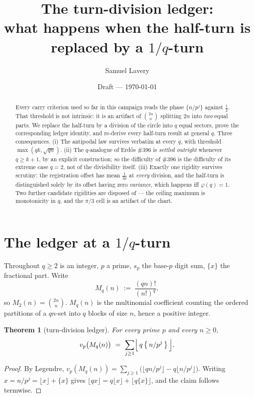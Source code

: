 \documentclass[11pt]{article}
\title{The turn-division ledger:\\ what happens when the half-turn is replaced by a
$1/q$-turn}
\author{Samuel Lavery}
\date{Draft --- \today}
\newtheorem{theorem}{Theorem}
\begin{document}
\maketitle

\begin{abstract}
Every carry criterion used so far in this campaign reads the phase $\{n/p^{j}\}$ against
$\tfrac12$.  That threshold is not intrinsic: it is an artifact of $\binom{2n}{n}$ splitting
$2n$ into \emph{two} equal parts.  We replace the half-turn by a division of the circle into
$q$ equal sectors, prove the corresponding ledger identity, and re-derive every half-turn
result at general $q$.  Three consequences.  (i) The antipodal law survives verbatim at every
$q$, with threshold $\max(qk,\sqrt{qn})$.  (ii) The $q$-analogue of Erd\H{o}s \#396 is
\emph{settled outright} whenever $q\ge k+1$, by an explicit construction; so the difficulty of
\#396 is the difficulty of its extreme case $q=2$, not of the divisibility itself.  (iii)
Exactly one rigidity survives scrutiny: the registration offset has mean $\tfrac1{2p}$ at
\emph{every} division, and the half-turn is distinguished solely by its offset having zero
\emph{variance}, which happens iff $\varphi(q)=1$.  Two further candidate rigidities are
disposed of --- the ceiling maximum is monotonicity in $q$, and the $\pi/3$ cell is an
artifact of the chart.
\end{abstract}

\section{The ledger at a $1/q$-turn}

Throughout $q\ge2$ is an integer, $p$ a prime, $s_p$ the base-$p$ digit sum, $\{x\}$ the
fractional part.  Write
\[
  M_q(n)\ :=\ \frac{(qn)!}{(n!)^{q}},
\]
so $M_2(n)=\binom{2n}{n}$.  $M_q(n)$ is the multinomial coefficient counting the ordered
partitions of a $qn$-set into $q$ blocks of size $n$, hence a positive integer.

\begin{theorem}[turn-division ledger]\label{thm:ledger}
For every prime $p$ and every $n\ge0$,
\[
  v_p\bigl(M_q(n)\bigr)\ =\ \sum_{j\ge1}\Bigl\lfloor\,q\,\bigl\{\,n/p^{j}\,\bigr\}\,\Bigr\rfloor .
\]
\end{theorem}

\begin{proof}
By Legendre, $v_p(M_q(n))=\sum_{j\ge1}\bigl(\lfloor qn/p^{j}\rfloor-q\lfloor
n/p^{j}\rfloor\bigr)$.  Writing $x=n/p^{j}=\lfloor x\rfloor+\{x\}$ gives
$\lfloor qx\rfloor=q\lfloor x\rfloor+\lfloor q\{x\}\rfloor$, and the claim follows termwise.
\end{proof}
\end{document}
